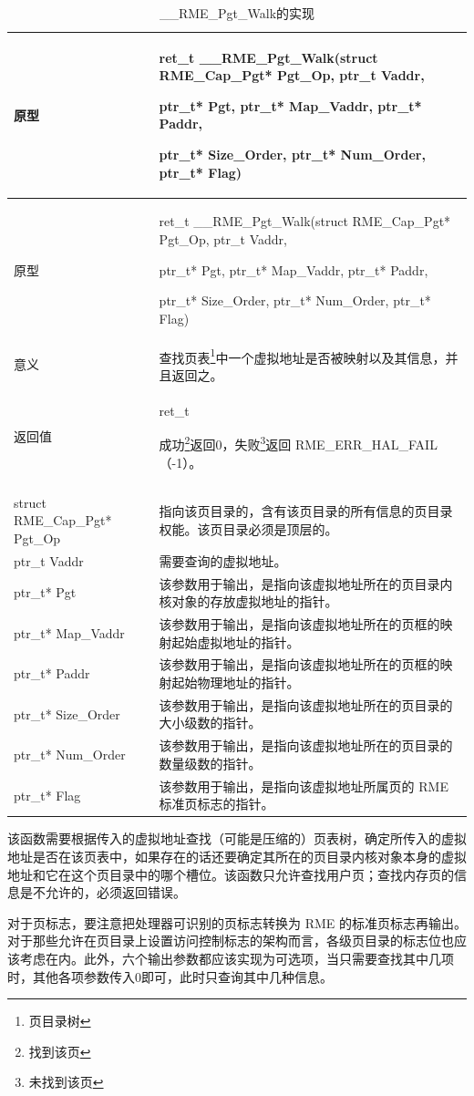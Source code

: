 \begin{xltabular}{\textwidth}{@{}>{\hsize\raggedright\arraybackslash}X>{\hsize\raggedright\arraybackslash}X@{}}
\caption{\_\_RME\_Pgt\_Walk的实现}\label{tab:7-84-rme-pgt-walk-implementation}\\
\toprule
原型\strut
 & ret\_t \_\_RME\_Pgt\_Walk(struct RME\_Cap\_Pgt* Pgt\_Op, ptr\_t Vaddr,

ptr\_t* Pgt, ptr\_t* Map\_Vaddr, ptr\_t* Paddr,

ptr\_t* Size\_Order, ptr\_t* Num\_Order, ptr\_t* Flag)\strut
\tabularnewline
\endfirsthead
\toprule
原型\strut
 & ret\_t \_\_RME\_Pgt\_Walk(struct RME\_Cap\_Pgt* Pgt\_Op, ptr\_t Vaddr,

ptr\_t* Pgt, ptr\_t* Map\_Vaddr, ptr\_t* Paddr,

ptr\_t* Size\_Order, ptr\_t* Num\_Order, ptr\_t* Flag)\strut
\tabularnewline
\midrule
\endhead
\bottomrule
\endlastfoot
意义 &
查找页表\footnote{页目录树}中一个虚拟地址是否被映射以及其信息，并且返回之。\tabularnewline
返回值\strut
 & ret\_t

成功\footnote{找到该页}返回0，失败\footnote{未找到该页}返回 RME\_ERR\_HAL\_FAIL（-1）。\strut\tabularnewline
{}\tabularnewline
struct RME\_Cap\_Pgt* Pgt\_Op & 指向该页目录的，含有该页目录的所有信息的页目录权能。该页目录必须是顶层的。\tabularnewline
ptr\_t Vaddr & 需要查询的虚拟地址。\tabularnewline
ptr\_t* Pgt & 该参数用于输出，是指向该虚拟地址所在的页目录内核对象的存放虚拟地址的指针。\tabularnewline
ptr\_t* Map\_Vaddr & 该参数用于输出，是指向该虚拟地址所在的页框的映射起始虚拟地址的指针。\tabularnewline
ptr\_t* Paddr & 该参数用于输出，是指向该虚拟地址所在的页框的映射起始物理地址的指针。\tabularnewline
ptr\_t* Size\_Order & 该参数用于输出，是指向该虚拟地址所在的页目录的大小级数的指针。\tabularnewline
ptr\_t* Num\_Order & 该参数用于输出，是指向该虚拟地址所在的页目录的数量级数的指针。\tabularnewline
ptr\_t* Flag & 该参数用于输出，是指向该虚拟地址所属页的 RME 标准页标志的指针。\tabularnewline
\end{xltabular}

该函数需要根据传入的虚拟地址查找（可能是压缩的）页表树，确定所传入的虚拟地址是否在该页表中，如果存在的话还要确定其所在的页目录内核对象本身的虚拟地址和它在这个页目录中的哪个槽位。该函数只允许查找用户页；查找内存页的信息是不允许的，必须返回错误。

对于页标志，要注意把处理器可识别的页标志转换为 RME 的标准页标志再输出。对于那些允许在页目录上设置访问控制标志的架构而言，各级页目录的标志位也应该考虑在内。此外，六个输出参数都应该实现为可选项，当只需要查找其中几项时，其他各项参数传入0即可，此时只查询其中几种信息。

